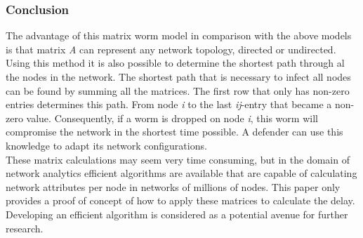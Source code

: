 \subsubsection*{Conclusion}
The advantage of this matrix worm model in comparison with the above models is that matrix  \textit{A} can represent any network topology, directed or undirected. \\
Using this method it is also possible to determine the shortest path through al the nodes in the network. The shortest path that is necessary to infect all nodes can be found by summing all the matrices. The first row that only has non-zero entries determines this path. From node \textit{i} to the last \textit{ij}-entry that became a non-zero value. Consequently, if a worm is dropped on node \textit{i}, this worm will compromise the network in the shortest time possible. A defender can use this knowledge to adapt its network configurations. \\
These matrix calculations may seem very time consuming, but in the domain of network analytics efficient algorithms are available that are capable of calculating network attributes per node in networks of millions of nodes. This paper only provides a proof of concept of how to apply these matrices to calculate the delay. Developing an efficient algorithm is considered as a potential avenue for further research. 
